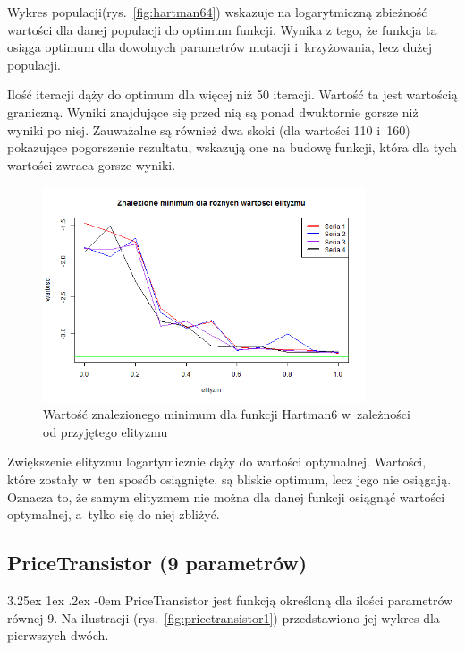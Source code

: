 \documentclass[11pt, a4paper]{article}
\makeatletter
\newcommand{\fbi}{\leavevmode{\parindent=1em\indent}}
\renewcommand\paragraph{\@startsection{paragraph}{5}{\z@}
  {3.25ex \@plus1ex \@minus.2ex}
  {-0em}
  {\normalfont\normalsize\bfseries}}
\makeatother
\begin{document}
\fbi
Wykres populacji(rys.~\ref{fig:hartman64}) wskazuje na logarytmiczną zbieżność wartości dla danej populacji do optimum funkcji. Wynika z tego, że funkcja ta osiąga optimum dla dowolnych parametrów mutacji i~krzyżowania, lecz dużej populacji.

\fbi
Ilość iteracji dąży do optimum dla więcej niż 50 iteracji. Wartość ta jest wartością graniczną. Wyniki znajdujące się przed nią są ponad dwuktornie gorsze niż wyniki po niej. Zauważalne są również dwa skoki (dla wartości 110 i~160) pokazujące pogorszenie rezultatu, wskazują one na budowę funkcji, która dla tych wartości zwraca gorsze wyniki.

\begin{figure}[H]
	\begin{center}
		\includegraphics[width=0.85\textwidth]{./assets/Hartman66.png}
		\caption{Wartość znalezionego minimum dla funkcji Hartman6 w~zależności od przyjętego elityzmu}
		\label{fig:hartman66}
	\end{center}
\end{figure}

\fbi
Zwiększenie elityzmu logartymicznie dąży do wartości optymalnej. Wartości, które zostały w~ten sposób osiągnięte, są bliskie optimum, lecz jego nie osiągają. Oznacza to, że samym elityzmem nie można dla danej funkcji osiągnąć wartości optymalnej, a~tylko się do niej zbliżyć.

\newpage
\subsection{PriceTransistor (9 parametrów)}
\paragraph{}
PriceTransistor jest funkcją określoną dla ilości parametrów równej 9. Na ilustracji (rys.~\ref{fig:pricetransistor1}) przedstawiono jej wykres dla pierwszych dwóch.
\end{document}
